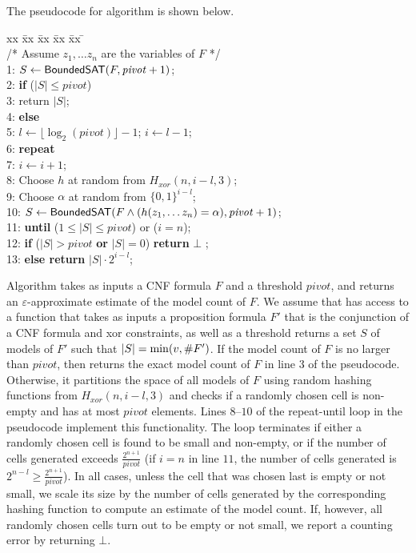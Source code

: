 The pseudocode for algorithm {\ApproxMCCore} is shown below.
\begin{tabbing} xx \= xx \= xx \= xx \= xx \= \kill
{}\\ 
/* Assume $z_1, \ldots z_n$ are the variables of $F$    */ \\
%
1:\> $S \leftarrow \mathsf{BoundedSAT}(F, \mathit{pivot} +1)$;\\
2:\> {\bfseries if} ($|S| \le \mathit{pivot}$)\\
3:\> \> return $|S|$; \\
4:\> {\bfseries else} \\
%
5:\> \> $l \leftarrow \lfloor \log_2 (\mathit{pivot}) \rfloor - 1$; $i \leftarrow l - 1$;\\
6:\> \> {\bfseries repeat}\\
7:\> \> \> $i \leftarrow i+1$;\\
8:\> \> \> Choose $h$ at random from $H_{xor}(n, i-l, 3)$; \\
9:\> \> \> Choose $\alpha$ at random from $\{0, 1\}^{i-l}$;\\
10:\> \> \> $S \leftarrow \mathsf{BoundedSAT}(F \wedge (h(z_1, \ldots z_n) = \alpha), \mathit{pivot}+1)$;\\
11:\> \> {\bfseries until} ($1 \le |S| \le \mathit{pivot}$) or ($i = n$);\\
12:\> \> {\bfseries if} ($|S| > \mathit{pivot}$ {\bfseries or} $|S| = 0$) {\bfseries return} $\bot$  ;\\
13:\> \> {\bfseries else return }  $|S| \cdot 2^{i-l}$;\\
\end{tabbing}
Algorithm {\ApproxMCCore} takes as inputs a CNF formula $F$ and a
threshold $pivot$, and returns an $\varepsilon$-approximate estimate
of the model count of $F$.  We assume that {\ApproxMCCore} has access
to a function {\BoundedSAT} that takes as inputs a proposition formula
$F'$ that is the conjunction of a CNF formula and xor constraints, as
well as a threshold  returns
a set $S$ of models of $F'$ such that $|S| = \min(v, \#F')$.
If the model count of $F$ is no larger than $\mathit{pivot}$, then
{\ApproxMCCore} returns the exact model count of $F$ in line $3$ of
the pseudocode.  Otherwise, it partitions the space of all models of
$F$ using random hashing functions from $H_{xor}(n, i-l, 3)$ and
checks if a randomly chosen cell is non-empty and has at most
$\mathit{pivot}$ elements.  Lines $8$--$10$ of the repeat-until loop
in the pseudocode implement this functionality.  The loop terminates
if either a randomly chosen cell is found to be small and non-empty,
or if the number of cells generated exceeds
$\frac{2^{n+1}}{\mathit{pivot}}$ (if $i=n$ in line $11$, the number of
cells generated is $2^{n-l} \ge \frac{2^{n+1}}{\mathit{pivot}}$).  In
all cases, unless the cell that was chosen last is empty or not small,
we scale its size by the number of cells generated by the
corresponding hashing function to compute an estimate of the model
count.  If, however, all randomly chosen cells turn out to be empty or
not small, we report a counting error by returning $\bot$.

